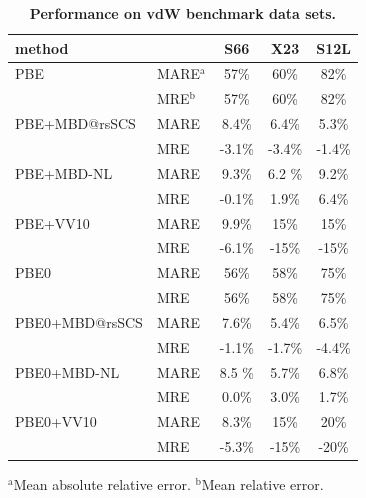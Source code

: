 \begin{table}[t!]
\centering
\caption{\textbf{Performance on vdW benchmark data sets.}}\label{tab:performance}
\begin{tabular}{ll*{3}{S[
  table-format=2.1,
  table-align-text-post=false,
  table-space-text-post=\%,
]}}
\toprule
method & & {S66} & {X23} & {S12L} \\
\midrule
PBE            & MARE$^\text{a}$ & 57\%   & 60\%   & 82\%   \\
               & MRE$^\text{b}$ & 57\%   & 60\%   & 82\%   \\
PBE+MBD@rsSCS  & MARE & 8.4\%  & 6.4\%  & 5.3\%  \\
               & MRE & -3.1\% & -3.4\% & -1.4\% \\
PBE+MBD-NL     & MARE & 9.3\%  & 6.2 \% & 9.2\%  \\
               & MRE & -0.1\% & 1.9\%  & 6.4\%  \\
PBE+VV10       & MARE & 9.9\%  & 15\%   & 15\%   \\
               & MRE & -6.1\% & -15\%  & -15\%  \\
\midrule
PBE0           & MARE & 56\%   & 58\%   & 75\%   \\
               & MRE & 56\%   & 58\%   & 75\%   \\
PBE0+MBD@rsSCS & MARE & 7.6\%  & 5.4\%  & 6.5\%  \\
               & MRE & -1.1\% & -1.7\% & -4.4\% \\
PBE0+MBD-NL    & MARE & 8.5 \% & 5.7\%  & 6.8\%  \\
               & MRE & 0.0\%  & 3.0\%  & 1.7\%  \\
PBE0+VV10      & MARE & 8.3\%  & 15\%   & 20\%   \\
               & MRE & -5.3\% & -15\%  & -20\%  \\
\bottomrule
\end{tabular}

\small
$^\text{a}$Mean absolute relative error.
$^\text{b}$Mean relative error.
\end{table}

